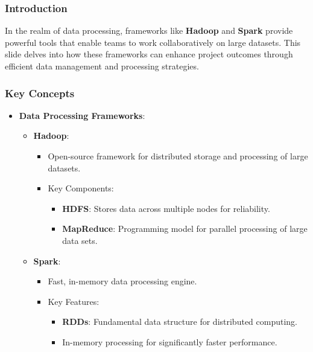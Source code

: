 \documentclass{beamer}
\begin{document}
\begin{frame}
    \titlepage
\end{frame}

\begin{frame}
    \frametitle{Introduction}
    In the realm of data processing, frameworks like \textbf{Hadoop} and \textbf{Spark} provide powerful tools that enable teams to work collaboratively on large datasets. 
    This slide delves into how these frameworks can enhance project outcomes through efficient data management and processing strategies.
\end{frame}

\begin{frame}
    \frametitle{Key Concepts}
    \begin{itemize}
        \item \textbf{Data Processing Frameworks}:
        \begin{itemize}
            \item \textbf{Hadoop}:
            \begin{itemize}
                \item Open-source framework for distributed storage and processing of large datasets.
                \item Key Components:
                \begin{itemize}
                    \item \textbf{HDFS}: Stores data across multiple nodes for reliability.
                    \item \textbf{MapReduce}: Programming model for parallel processing of large data sets.
                \end{itemize}
            \end{itemize}
            \item \textbf{Spark}:
            \begin{itemize}
                \item Fast, in-memory data processing engine.
                \item Key Features:
                \begin{itemize}
                    \item \textbf{RDDs}: Fundamental data structure for distributed computing.
                    \item In-memory processing for significantly faster performance.
                \end{itemize}
            \end{itemize}
        \end{itemize}
    \end{itemize}
\end{frame}
\end{document}
